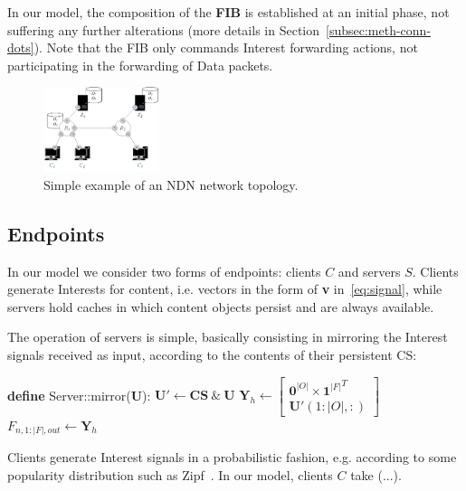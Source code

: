 In our model, the composition of the \textbf{FIB} is established at an initial phase, 
not suffering any further alterations (more details in 
Section~\ref{subsec:meth-conn-dots}). Note 
that the FIB only commands Interest forwarding actions, not participating in the 
forwarding of Data packets.

\begin{figure}[h!]

    \centering
    \includegraphics[width=0.30\textwidth]{figures/fib-topo.png}
    \cprotect\caption{Simple example of an NDN network topology.}
    \label{fig:fib-topo}

\end{figure}

\subsection{Endpoints}
\label{subsec:meth-endpoints}

In our model we consider two forms of endpoints: clients $C$ and servers $S$. 
Clients generate Interests for content, i.e. vectors in the form of \textbf{v} 
in~\ref{eq:signal}, while servers hold caches in which content objects persist 
and are always available.\shortvertbreak

The operation of servers is simple, basically consisting in mirroring the 
Interest signals received as input, according to the contents of their 
persistent CS:\shortvertbreak

\begin{algorithmic}[1]

\State \textbf{define} Server::mirror(\textbf{U}):
\State
    \State $\textbf{U}' \leftarrow \textbf{CS} \ \& \ \textbf{U}$ 
    \State
    \State $\textbf{Y}_h \leftarrow \begin{bmatrix} \textbf{0}^{|O|} \times {\textbf{1}^{|F|}}^{T} \\ \textbf{U}'(1:|O|,:) \end{bmatrix}$ 
    \State
    \State $F_{n,1:|F|,out} \leftarrow \textbf{Y}_h$

\end{algorithmic}\shortvertbreak

Clients generate Interest signals in a probabilistic fashion, e.g. according 
to some popularity distribution such as Zipf~\cite{6038471}. In our model, 
clients $C$ take (...).

